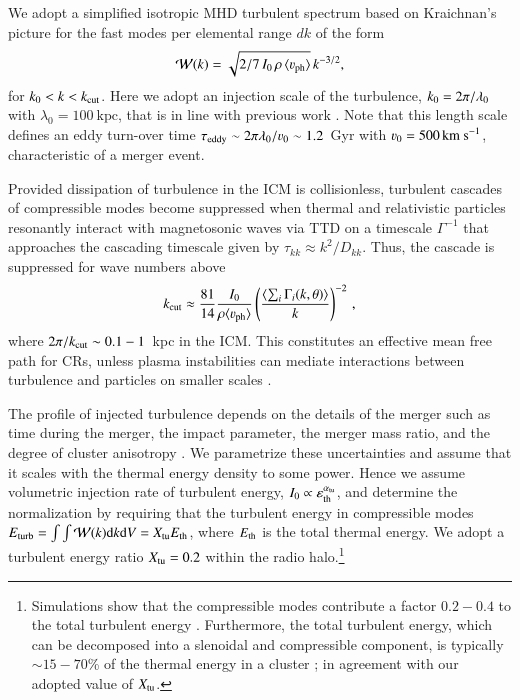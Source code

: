 \documentclass[fleqn,usenatbib,useAMS]{mnras}
\newcommand{\Vph}{\varv_\mathrm{ph}}
\newcommand{\eps}{\varepsilon}
\begin{document}
We adopt a simplified isotropic MHD turbulent spectrum based on
Kraichnan's picture for the fast modes per elemental range $dk$ of the
form
\begin{equation}
  \label{eq:Wk}
  \mathcal{W}(k) =
\sqrt{2/7\,I_0\,\rho\,\langle \Vph \rangle}\,k^{-3/2},
\end{equation}
for $k_0<k<k_{\mathrm{cut}}$. Here we adopt an injection scale of the
turbulence, $k_0= 2\pi/\lambda_0$ with $\lambda_0 =100~\mbox{kpc}$,
that is in line with previous work
\citep{2006MNRAS.366.1437S,brunetti07,brunetti11}. Note that this
length scale defines an eddy turn-over time
$\tau_{\rmn{eddy}}\sim2\upi\lambda_0/\varv_0\sim1.2$~Gyr with
$\varv_0=500\,\rmn{km~s}^{-1}$, characteristic of a merger event.

Provided dissipation of turbulence in the ICM is collisionless,
turbulent cascades of compressible modes become suppressed when
thermal and relativistic particles resonantly interact with
magnetosonic waves via TTD on a timescale $\Gamma^{-1}$ that
approaches the cascading timescale given by $\tau_{kk} \approx
k^2/D_{kk}$. Thus, the cascade is suppressed for wave numbers above
\begin{equation}
\label{eq:kc}
  k_\rmn{cut} \approx \frac{81}{14} \frac{I_0}{\rho \langle \Vph \rangle}
  \left(\frac{\langle\sum_i \Gamma_i(k,\theta)\rangle}{k}\right)^{-2}\,,
\end{equation}
where $2\pi/k_{\mathrm{cut}}\sim 0.1-1$~kpc in the ICM. This constitutes an
effective mean free path for CRs, unless plasma instabilities can
mediate interactions between turbulence and particles on smaller
scales \citep{brunetti11}.

The profile of injected turbulence depends on the details of the
merger such as time during the merger, the impact parameter, the
merger mass ratio, and the degree of cluster anisotropy
\citep{miniati15}. We parametrize these uncertainties and
assume that it scales with the thermal energy density to some
power. Hence we assume volumetric injection rate of turbulent energy,
$I_0\propto \eps_\rmn{th}^{\alpha_\rmn{tu}}$, and determine the
normalization by requiring that the turbulent energy in compressible
modes $E_{\mathrm{turb}}=\int \int \mathcal{W}(k) {\mathrm{d}}k {\mathrm{d}}V =
X_{\mathrm{tu}} E_{\mathrm{th}}$, where $E_{\mathrm{th}}$ is the total thermal
energy. We adopt a turbulent energy ratio $X_{\mathrm{tu}}=0.2$ within the
radio halo.\footnote{Simulations show that the compressible modes
  contribute a factor $0.2-0.4$ to the total turbulent energy
  \citep{2013ApJ...771..131B,miniati15}. Furthermore, the
  total turbulent energy, which can be decomposed into a slenoidal and
  compressible component, is typically $\sim15-70$\% of the thermal
  energy in a cluster \citep{2011A&A...529A..17V}; in agreement with
  our adopted value of $X_{\mathrm{tu}}$.}
\end{document}
